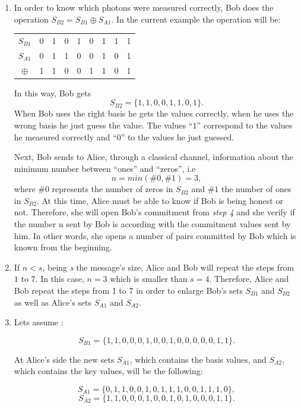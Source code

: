 \begin{enumerate}
  \item In order to know which photons were measured correctly, Bob does the operation $S_{B2}=S_{B1} \oplus S_{A1}$.
      In the current example the operation will be:

  \begin{table}[H]
    \centering
    \begin{tabular}{c|c c c c c c c c}
     $S_{B1}$ & 0 & 1 & 0 & 1 & 0 & 1 & 1 & 1 \\
     $S_{A1}$ & 0 & 1 & 1 & 0 & 0 & 1 & 0 & 1 \\ \hline
     $\oplus$ & 1 & 1 & 0 & 0 & 1 & 1 & 0 & 1
    \end{tabular}
    \end{table}

      In this way, Bob gets $$S_{B2} = \{1,1,0,0,1,1,0,1 \}.$$ When Bob uses the right basis he gets the values correctly, when he uses the wrong basis he just guess the value. The values ``$1$'' correspond to the values he measured correctly and ``$0$'' to the values he just guessed.

       Next, Bob sends to Alice, through a classical channel, information about the minimum number between ``ones'' and ``zeros'', i.e $$n=min(\#0,\#1)=3,$$ where $\#0$ represents the number of zeros in $S_{B2}$ and $\#1$ the number of ones in $S_{B2}$. At this time, Alice must be able to know if Bob is being honest or not. Therefore, she will open Bob's commitment from \textit{step 4} and she verify if the number n sent by Bob is according with the commitment values sent by him. In other words, she opens a number of pairs committed by Bob which is known from the beginning.

  \item If $n<s$, being \textit{s} the message's size, Alice and Bob will repeat the steps from $1$ to $7$. In this case, $n=3$ which is smaller than $s=4$. Therefore, Alice and Bob repeat the steps from 1 to 7 in order to enlarge Bob's sets $S_{B1}$ and $S_{B2}$ as well as Alice's sets $S_{A1}$ and $S_{A2}$.

  \item Lets assume :

   $$S_{B1}= \{1,1,0,0,0,1,0,0,1,0,0,0,0,0,1,1 \}.$$

    At Alice's side the new sets $S_{A1}$, which contains the basis values, and $S_{A2}$, which contains the key values, will be the following:

    $$S_{A1}=\{0,1,1,0,0,1,0,1,1,1,0,0,1,1,1,0 \},$$ $$S_{A2}=\{1,1,0,0,0,1,0,0,1,0,1,0,0,0,1,1 \}.$$


\end{enumerate}
